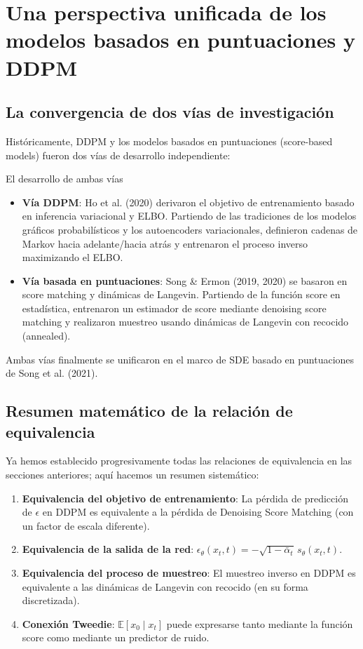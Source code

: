 \section{Una perspectiva unificada de los modelos basados en puntuaciones y DDPM}

\subsection{La convergencia de dos vías de investigación}

Históricamente, DDPM y los modelos basados en puntuaciones (score-based models) fueron dos vías de desarrollo independiente:

\begin{knowledgebox}{El desarrollo de ambas vías}
\begin{itemize}
    \item \textbf{Vía DDPM}: Ho et al. (2020) derivaron el objetivo de entrenamiento basado en inferencia variacional y ELBO. Partiendo de las tradiciones de los modelos gráficos probabilísticos y los autoencoders variacionales, definieron cadenas de Markov hacia adelante/hacia atrás y entrenaron el proceso inverso maximizando el ELBO.
    \item \textbf{Vía basada en puntuaciones}: Song \& Ermon (2019, 2020) se basaron en score matching y dinámicas de Langevin. Partiendo de la función score en estadística, entrenaron un estimador de score mediante denoising score matching y realizaron muestreo usando dinámicas de Langevin con recocido (annealed).
\end{itemize}
Ambas vías finalmente se unificaron en el marco de SDE basado en puntuaciones de Song et al. (2021).
\end{knowledgebox}

\subsection{Resumen matemático de la relación de equivalencia}

Ya hemos establecido progresivamente todas las relaciones de equivalencia en las secciones anteriores; aquí hacemos un resumen sistemático:

\begin{enumerate}
    \item \textbf{Equivalencia del objetivo de entrenamiento}: La pérdida de predicción de $\epsilon$ en DDPM es equivalente a la pérdida de Denoising Score Matching (con un factor de escala diferente).
    \item \textbf{Equivalencia de la salida de la red}: $\epsilon_\theta(x_t, t) = -\sqrt{1-\bar{\alpha}_t}\, s_\theta(x_t, t)$.
    \item \textbf{Equivalencia del proceso de muestreo}: El muestreo inverso en DDPM es equivalente a las dinámicas de Langevin con recocido (en su forma discretizada).
    \item \textbf{Conexión Tweedie}: $\mathbb{E}[x_0 \mid x_t]$ puede expresarse tanto mediante la función score como mediante un predictor de ruido.
\end{enumerate}


